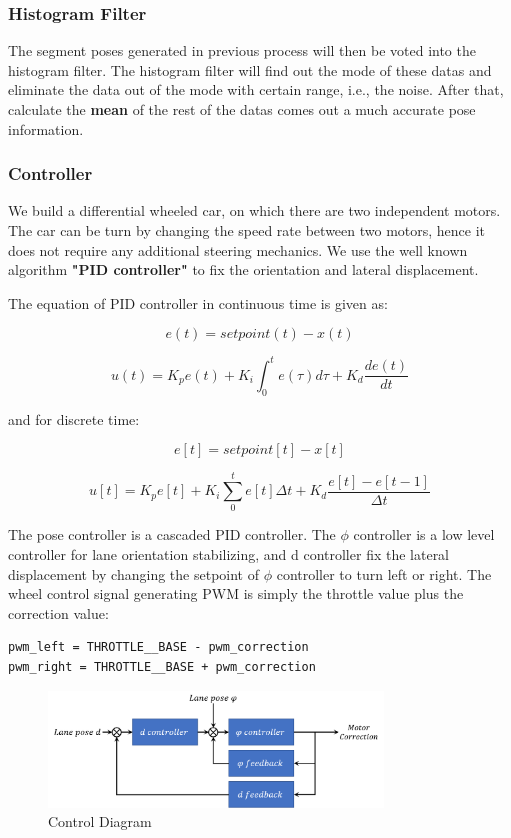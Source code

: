 \documentclass[conference]{IEEEtran}
\begin{document}
\subsubsection{Histogram Filter}

The segment poses generated in previous process will then be voted into the histogram filter. The histogram filter will find out the mode of these datas and eliminate the data out of the mode with certain range, i.e., the noise. After that, calculate the \textbf{mean} of the rest of the datas comes out a much accurate pose information.

\subsubsection{Controller}We build a differential wheeled car, on which there are two independent motors. The car can be turn by changing the speed rate between two motors, hence it does not require any additional steering mechanics. We use the well known algorithm \textbf{"PID controller"} to fix the orientation and lateral displacement.

The equation of PID controller in continuous time is given as:

\[e(t) = setpoint(t) - x(t)\]

\[u(t) = K_p e(t) + K_i \int_{0}^{t} e(\tau) d\tau + K_d  \frac{de(t)}{dt}\]

and for discrete time:

\[e[t] = setpoint[t] - x[t]\]

\[u[t] = K_p e[t] + K_i \sum_0^t e[t] \Delta t + K_d \frac{e[t] - e[t-1]}{\Delta t}\]

The pose controller is a cascaded PID controller. The $\phi$ controller is a low level controller for lane orientation stabilizing, and d controller fix the lateral displacement by changing the setpoint of $\phi$ controller to turn left or right.
The wheel control signal generating PWM is simply the throttle value plus the correction value:

\begin{lstlisting}
pwm_left = THROTTLE__BASE - pwm_correction
pwm_right = THROTTLE__BASE + pwm_correction
\end{lstlisting}

\begin{figure}	
	\centering
	\includegraphics[width=3.5in]{img/controller.png}
	\caption{Control Diagram}
	\label{fig:controller}
\end{figure}
\end{document}
